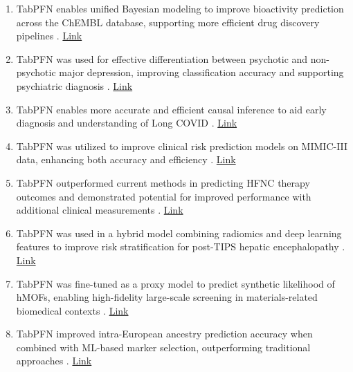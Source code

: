 \begin{enumerate}
\item TabPFN enables unified Bayesian modeling to improve bioactivity prediction across the ChEMBL database, supporting more efficient drug discovery pipelines \cite{backenkhler2026chempfn}. \href{https://doi.org/10.26434/chemrxiv.15000292/v1}{Link}

\item TabPFN was used for effective differentiation between psychotic and non-psychotic major depression, improving classification accuracy and supporting psychiatric diagnosis \cite{zheng2026differentiation}. \href{https://doi.org/10.1016/j.jad.2026.121454}{Link}

\item TabPFN enables more accurate and efficient causal inference to aid early diagnosis and understanding of Long COVID \cite{githubGitHubSindyPinTACO}. \href{https://github.com/SindyPin/TACO}{Link}

\item TabPFN was utilized to improve clinical risk prediction models on MIMIC-III data, enhancing both accuracy and efficiency \cite{githubGitHubAhmedAlMaroufFoundationModel_on_Mimic3_ClinRisk}. \href{https://github.com/AhmedAlMarouf/FoundationModel_on_Mimic3_ClinRisk}{Link}

\item TabPFN outperformed current methods in predicting HFNC therapy outcomes and demonstrated potential for improved performance with additional clinical measurements \cite{yu2025evaluating}. \href{https://doi.org/10.1186/s13054-025-05765-1}{Link}

\item TabPFN was used in a hybrid model combining radiomics and deep learning features to improve risk stratification for post-TIPS hepatic encephalopathy \cite{miao2025enhancing}. \href{https://doi.org/10.1007/s12072-025-10934-z}{Link}

\item TabPFN was fine-tuned as a proxy model to predict synthetic likelihood of hMOFs, enabling high-fidelity large-scale screening in materials-related biomedical contexts \cite{wu2025digital}. \href{https://doi.org/10.1002/adfm.202519565}{Link}

\item TabPFN improved intra-European ancestry prediction accuracy when combined with ML-based marker selection, outperforming traditional approaches \cite{maurer2025enhancing}. \href{https://doi.org/10.1101/2025.11.08.687358}{Link}


\end{enumerate}
